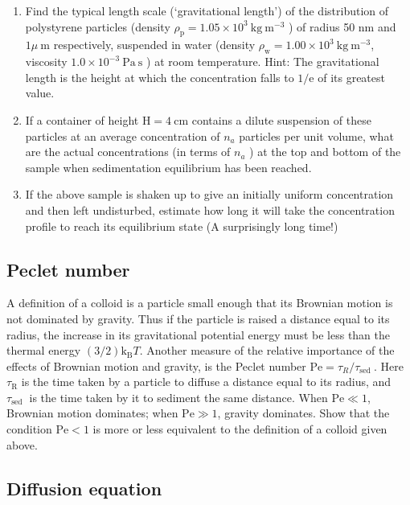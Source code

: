 \documentclass[
  letterpaper,
  enabledeprecatedfontcommands]{report}
\providecommand{\tightlist}{%
  \setlength{\itemsep}{0pt}\setlength{\parskip}{0pt}}
\begin{document}
\begin{enumerate}
\def\labelenumi{(\alph{enumi})}
\tightlist
\item
  Find the typical length scale (`gravitational length') of the
  distribution of polystyrene particles (density
  \(\rho_{\mathrm{p}}=1.05 \times 10^{3} \mathrm{~kg} \mathrm{~m}^{-3}\)
  ) of radius 50 nm and \(1 \mu \mathrm{~m}\) respectively, suspended in
  water (density
  \(\rho_{\mathrm{w}}=1.00 \times 10^{3} \mathrm{~kg} \mathrm{~m}^{-3}\),
  viscosity \(1.0 \times 10^{-3} \mathrm{~Pa} \mathrm{~s}\) ) at room
  temperature. Hint: The gravitational length is the height at which the
  concentration falls to \(1 / \mathrm{e}\) of its greatest value.
\item
  If a container of height \(\mathrm{H}=4 \mathrm{~cm}\) contains a
  dilute suspension of these particles at an average concentration of
  \(n_{a}\) particles per unit volume, what are the actual
  concentrations (in terms of \(n_{a}\) ) at the top and bottom of the
  sample when sedimentation equilibrium has been reached.
\item
  If the above sample is shaken up to give an initially uniform
  concentration and then left undisturbed, estimate how long it will
  take the concentration profile to reach its equilibrium state (A
  surprisingly long time!)
\end{enumerate}

\subsection{Peclet number}\label{peclet-number}

A definition of a colloid is a particle small enough that its Brownian
motion is not dominated by gravity. Thus if the particle is raised a
distance equal to its radius, the increase in its gravitational
potential energy must be less than the thermal energy
\((3 / 2) \mathrm{k}_{\mathrm{B}} T\). Another measure of the relative
importance of the effects of Brownian motion and gravity, is the Peclet
number \(\mathrm{Pe}=\tau_{R} / \tau_{\text {sed }}\). Here
\(\tau_{\mathrm{R}}\) is the time taken by a particle to diffuse a
distance equal to its radius, and \(\tau_{\text {sed }}\) is the time
taken by it to sediment the same distance. When \(\mathrm{Pe} \ll 1\),
Brownian motion dominates; when \(\mathrm{Pe} \gg 1\), gravity
dominates. Show that the condition \(\mathrm{Pe}<1\) is more or less
equivalent to the definition of a colloid given above.

\subsection{Diffusion equation}\label{diffusion-equation}
\end{document}
